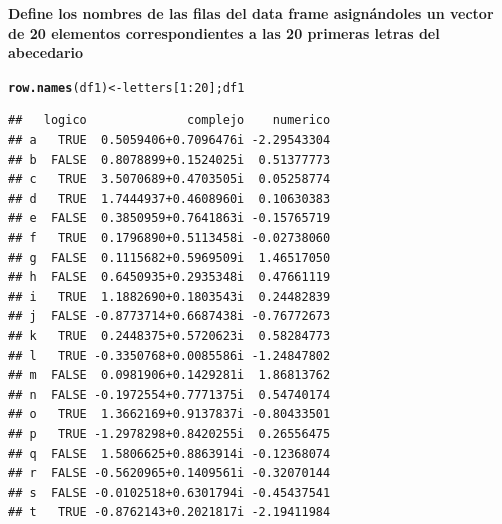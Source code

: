 \documentclass[12pt,letterpaper]{article}\usepackage[]{graphicx}\usepackage[]{color}
\makeatletter
\newcommand{\hlnum}[1]{\textcolor[rgb]{0.686,0.059,0.569}{#1}}%
\newcommand{\hlopt}[1]{\textcolor[rgb]{0,0,0}{#1}}%
\newcommand{\hlstd}[1]{\textcolor[rgb]{0.345,0.345,0.345}{#1}}%
\newcommand{\hlkwb}[1]{\textcolor[rgb]{0.69,0.353,0.396}{#1}}%
\newcommand{\hlkwd}[1]{\textcolor[rgb]{0.737,0.353,0.396}{\textbf{#1}}}%
\newenvironment{kframe}{%
 \def\at@end@of@kframe{}%
 \ifinner\ifhmode%
  \def\at@end@of@kframe{\end{minipage}}%
  \begin{minipage}{\columnwidth}%
 \fi\fi%
 \def\FrameCommand##1{\hskip\@totalleftmargin \hskip-\fboxsep
 \colorbox{shadecolor}{##1}\hskip-\fboxsep
     \hskip-\linewidth \hskip-\@totalleftmargin \hskip\columnwidth}%
 \MakeFramed {\advance\hsize-\width
   \@totalleftmargin\z@ \linewidth\hsize
   \@setminipage}}%
 {\par\unskip\endMakeFramed%
 \at@end@of@kframe}
\newenvironment{knitrout}{}{} %
\makeatother
\begin{document}
\textbf{Define los nombres de las filas del data frame asign\'andoles un vector de 20 elementos correspondientes a las 20 primeras letras del abecedario}
\begin{knitrout}
\color{fgcolor}\begin{kframe}
\begin{alltt}
\hlkwd{row.names}\hlstd{(df1)} \hlkwb{<-} \hlstd{letters[}\hlnum{1}\hlopt{:}\hlnum{20}\hlstd{]; df1}
\end{alltt}
\begin{verbatim}
##   logico              complejo    numerico
## a   TRUE  0.5059406+0.7096476i -2.29543304
## b  FALSE  0.8078899+0.1524025i  0.51377773
## c   TRUE  3.5070689+0.4703505i  0.05258774
## d   TRUE  1.7444937+0.4608960i  0.10630383
## e  FALSE  0.3850959+0.7641863i -0.15765719
## f   TRUE  0.1796890+0.5113458i -0.02738060
## g  FALSE  0.1115682+0.5969509i  1.46517050
## h  FALSE  0.6450935+0.2935348i  0.47661119
## i   TRUE  1.1882690+0.1803543i  0.24482839
## j  FALSE -0.8773714+0.6687438i -0.76772673
## k   TRUE  0.2448375+0.5720623i  0.58284773
## l   TRUE -0.3350768+0.0085586i -1.24847802
## m  FALSE  0.0981906+0.1429281i  1.86813762
## n  FALSE -0.1972554+0.7771375i  0.54740174
## o   TRUE  1.3662169+0.9137837i -0.80433501
## p   TRUE -1.2978298+0.8420255i  0.26556475
## q  FALSE  1.5806625+0.8863914i -0.12368074
## r  FALSE -0.5620965+0.1409561i -0.32070144
## s  FALSE -0.0102518+0.6301794i -0.45437541
## t   TRUE -0.8762143+0.2021817i -2.19411984
\end{verbatim}
\end{kframe}
\end{knitrout}
\end{document}
